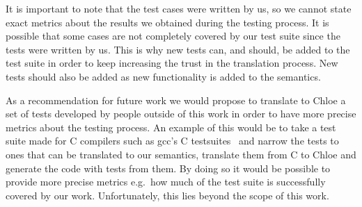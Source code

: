 It is important to note that the test cases were written by us, so we cannot state exact metrics about the results we obtained during the testing process.
It is possible that some cases are not completely covered by our test suite since the tests were written by us.
This is why new tests can, and should, be added to the test suite in order to keep increasing the trust in the translation process.
New tests should also be added as new functionality is added to the semantics.

As a recommendation for future work we would propose to translate to Chloe a set of tests developed by people outside of this work in order to have more precise metrics about the testing process.
An example of this would be to take a test suite made for C compilers such as gcc's C testsuites~\parencite{gcc-tests} and narrow the tests to ones that can be translated to our semantics, translate them from C to Chloe and generate the code with tests from them.
By doing so it would be possible to provide more precise metrics e.g.\ how much of the test suite is successfully covered by our work.
Unfortunately, this lies beyond the scope of this work.